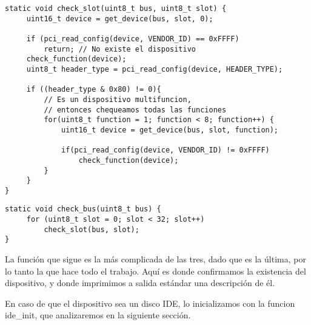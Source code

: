 \begin{lstlisting}[style=customcmucho]
static void check_slot(uint8_t bus, uint8_t slot) {
     uint16_t device = get_device(bus, slot, 0);
 
     if (pci_read_config(device, VENDOR_ID) == 0xFFFF)
         return; // No existe el dispositivo
     check_function(device);
     uint8_t header_type = pci_read_config(device, HEADER_TYPE);

     if ((header_type & 0x80) != 0){
         // Es un dispositivo multifuncion, 
         // entonces chequeamos todas las funciones
         for(uint8_t function = 1; function < 8; function++) {
             uint16_t device = get_device(bus, slot, function);
             
             if(pci_read_config(device, VENDOR_ID) != 0xFFFF)
                 check_function(device);
         }
     } 
}
\end{lstlisting}

\begin{lstlisting}[style=customcmucho]
static void check_bus(uint8_t bus) { 
     for (uint8_t slot = 0; slot < 32; slot++)
         check_slot(bus, slot);
}
\end{lstlisting}

La función que sigue es la más complicada de las tres, dado que es la última, por lo tanto la que hace todo el trabajo. Aquí es donde confirmamos la existencia del dispositivo, y donde imprimimos a salida estándar una descripción de él.

En caso de que el dispositivo sea un disco IDE, lo inicializamos con la funcion ide\_init, que analizaremos en la siguiente sección.

